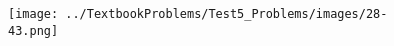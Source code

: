 \begin{figure}[h]
\centering
{\texttt{[image: ../TextbookProblems/Test5\_Problems/images/28-43.png]}}
\end{figure}